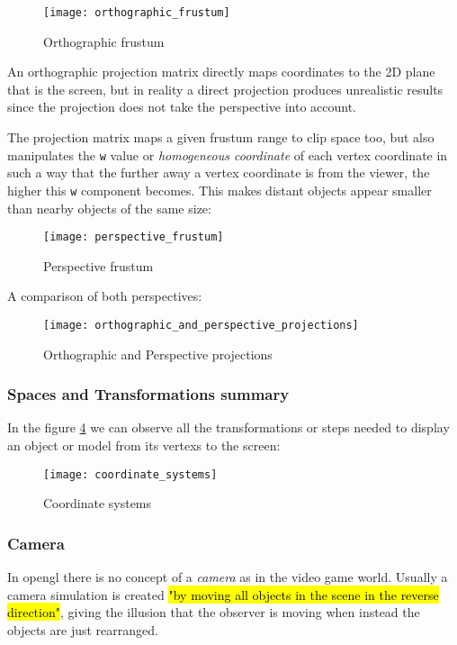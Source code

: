 \begin{figure}[h!]
	\centering
	\texttt{[image: orthographic\_frustum]}
	\caption{Orthographic frustum \cite{learnopengl}}
	\label{fig:orthographic_frustum}
\end{figure}

An orthographic projection matrix directly maps coordinates to the 2D plane that is the screen, but in reality a direct projection produces unrealistic results since the projection does not take the perspective into account. 


The projection matrix maps a given frustum range to clip space too, but also manipulates the \verb|w| value or \emph{homogeneous coordinate} of each vertex coordinate in such a way that the further away a vertex coordinate is from the viewer, the higher this \verb|w| component becomes. This makes distant objects appear smaller than nearby objects of the same size:


\begin{figure}[h!]
	\centering
	\texttt{[image: perspective\_frustum]}
	\caption{Perspective frustum \cite{learnopengl}}
	\label{fig:perspective_frustum}
\end{figure}

A comparison of both perspectives:

\begin{figure}[h!]
	\centering
	\texttt{[image: orthographic\_and\_perspective\_projections]}
	\caption{Orthographic and Perspective projections \cite{superbible}}
	\label{fig:orthographic_and_perspective_projections}
\end{figure}

\subsubsection{Spaces and Transformations summary}

In the figure \ref{fig:coordinate_systems} we can observe all the transformations or steps needed to display an object or model from its \glspl{vertex} to the screen:

\begin{figure}[h!]
	\centering
	\texttt{[image: coordinate\_systems]}
	\caption{Coordinate systems \cite{learnopengl}}
	\label{fig:coordinate_systems}
\end{figure}

\subsubsection{Camera}
In \gls{opengl} there is no concept of a \emph{camera} as in the video game world. Usually a camera simulation is created \hl{"by moving all objects in the scene in the reverse direction"}, giving the illusion that the observer is moving \cite{learnopengl} when instead the objects are just rearranged.

